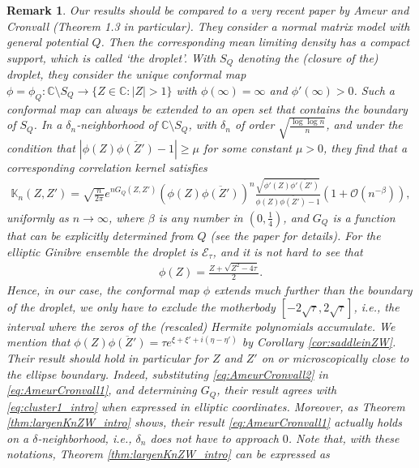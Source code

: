 \documentclass[%
 jmp,
cp,  %
 amsmath,amsthm,amssymb,%
 reprint,%
onecolumn]{revtex4-2}
\newtheorem{remark}[theorem]{Remark}
\begin{document}
 \begin{remark} \label{remark:AmeurCronvall}
    Our results should be compared to a very recent paper by Ameur and Cronvall \cite{AmCr}(Theorem 1.3 in particular). They consider a normal matrix model with general potential $Q$. Then the corresponding mean limiting density has a compact support, which is called `the droplet'. With $S_Q$ denoting the (closure of the) droplet, they consider the unique conformal map $\phi = \phi_Q : \mathbb C\setminus S_Q\to \{Z\in \mathbb C : |Z| > 1\}$ with $\phi(\infty)=\infty$ and $\phi'(\infty)>0$. Such a conformal map can always be extended to an open set that contains the boundary of $S_Q$. In a $\delta_n$-neighborhood of $\mathbb C\setminus S_Q$, with $\delta_n$ of order $\sqrt{\frac{\log \log n}{n}}$, and under the condition that $|\phi(Z) \overline{\phi(Z')}-1|\geq \mu$ for some constant $\mu>0$, they find that a corresponding correlation kernel satisfies
\begin{align} \label{eq:AmeurCronvall1}
\mathbb K_n(Z,Z') = \sqrt{\frac{n}{2\pi}} e^{n G_Q(Z,Z')} 
\left(\phi(Z) \overline{\phi(Z')}\right)^n
\frac{\sqrt{\phi'(Z) \overline{\phi'(Z')}}}{\phi(Z) \overline{\phi(Z')} -1}
\left(1+\mathcal O(n^{-\beta})\right),
\end{align}
uniformly as $n\to\infty$, where $\beta$ is any number in $(0,\frac{1}{4})$, and $G_Q$ is a function that can be explicitly determined from $Q$ (see the paper for details). For the elliptic Ginibre ensemble the droplet is $\mathcal E_\tau$, and it is not hard to see that
\begin{align} \label{eq:AmeurCronvall2}
\phi(Z) = \frac{Z+\sqrt{Z^2-4\tau}}{2}.
\end{align}
Hence, in our case, the conformal map $\phi$ extends much further than the boundary of the droplet, we only have to exclude the motherbody $[-2\sqrt\tau, 2\sqrt\tau]$, i.e., the interval where the zeros of the (rescaled) Hermite polynomials accumulate. We mention that $\phi(Z) \overline{\phi(Z')}=\tau e^{\xi+\xi'+i(\eta-\eta')}$ 
by Corollary \ref{cor:saddleinZW}. Their result should hold in particular for $Z$ and $Z'$ on or microscopically close to the ellipse boundary. Indeed, substituting \eqref{eq:AmeurCronvall2} in \eqref{eq:AmeurCronvall1}, and determining $G_Q$, their result agrees with \eqref{eq:cluster1_intro} when expressed in elliptic coordinates. 
Moreover, as Theorem \ref{thm:largenKnZW_intro} shows, their result \eqref{eq:AmeurCronvall1} actually holds on a $\delta$-neighborhood, i.e., $\delta_n$ does not have to approach $0$. Note that, with these notations, Theorem \ref{thm:largenKnZW_intro} can be expressed as

\end{remark}
\end{document}
